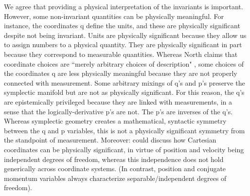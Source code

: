 \documentclass[letterpaper]{article}
\begin{document}
We agree that providing a physical interpretation of the invariants is important. However, some non-invariant quantities can be physically meaningful. For instance, the coordinates q define the units, and these are physically significant despite not being invariant. Units are physically significant because they allow us to assign numbers to a physical quantity. They are physically significant in part because they correspond to measurable quantities. Whereas North claims that coordinate choices are ``merely arbitrary choices of description" \parencites*[61]{North2009}, some choices of the coordinates q are less physically meaningful because they are not properly connected with measurement. Some arbitrary mixings of q's and p's preserve the symplectic manifold but are not as physically significant. For this reason, the q's are epistemically privileged because they are linked with measurements, in a sense that the logically-derivative p's are not. The p's are inverses of the q's. Whereas symplectic geometry creates a mathematical, syntactic symmetry between the q and p variables, this is not a physically significant symmetry from the standpoint of measurement.
Moreover: could discuss how Cartesian coordinates can be physically significant, in virtue of position and velocity being independent degrees of freedom, whereas this independence does not hold generically across coordinate systems. (In contrast, position and conjugate momentum variables always characterize separable/independent degrees of freedom).
\end{document}
